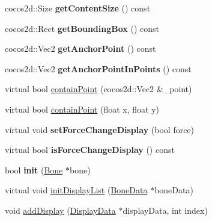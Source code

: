 \begin{DoxyCompactItemize}
\item 
\mbox{\label{classcocostudio_1_1DisplayManager_a621ac77f64739e157b976667bfaff368}} 
cocos2d\+::\+Size {\bfseries get\+Content\+Size} () const
\item 
\mbox{\label{classcocostudio_1_1DisplayManager_adbd3df0dffeeebc11b0d864831ce24e3}} 
cocos2d\+::\+Rect {\bfseries get\+Bounding\+Box} () const
\item 
\mbox{\label{classcocostudio_1_1DisplayManager_aa8bbc8c04e308867797ec190abd605a4}} 
cocos2d\+::\+Vec2 {\bfseries get\+Anchor\+Point} () const
\item 
\mbox{\label{classcocostudio_1_1DisplayManager_a306ad084a7342afe4016e6d206912b0c}} 
cocos2d\+::\+Vec2 {\bfseries get\+Anchor\+Point\+In\+Points} () const
\item 
virtual bool \hyperlink{classcocostudio_1_1DisplayManager_ae29e9c2724c2917efea6b6a584a3d7bd}{contain\+Point} (cocos2d\+::\+Vec2 \&\+\_\+point)
\item 
virtual bool \hyperlink{classcocostudio_1_1DisplayManager_a7c2026aa1027bdce066a883dfc1443db}{contain\+Point} (float x, float y)
\item 
\mbox{\label{classcocostudio_1_1DisplayManager_a0aee8f48f41fe3079c6d0053d622b942}} 
virtual void {\bfseries set\+Force\+Change\+Display} (bool force)
\item 
\mbox{\label{classcocostudio_1_1DisplayManager_ac3b548fc4393d8c7fa6af3d871b70722}} 
virtual bool {\bfseries is\+Force\+Change\+Display} () const
\item 
\mbox{\label{classcocostudio_1_1DisplayManager_ac5591fb1eda52851b9bb56fed2dde96b}} 
bool {\bfseries init} (\hyperlink{classcocostudio_1_1Bone}{Bone} $\ast$bone)
\item 
virtual void \hyperlink{classcocostudio_1_1DisplayManager_a5c87cebae7ca6e84ad6656cb4ba2d555}{init\+Display\+List} (\hyperlink{classcocostudio_1_1BoneData}{Bone\+Data} $\ast$bone\+Data)
\item 
void \hyperlink{classcocostudio_1_1DisplayManager_a8e9ebcae212efcdebc814dc4010b4fc8}{add\+Display} (\hyperlink{classcocostudio_1_1DisplayData}{Display\+Data} $\ast$display\+Data, int index)

\end{DoxyCompactItemize}
